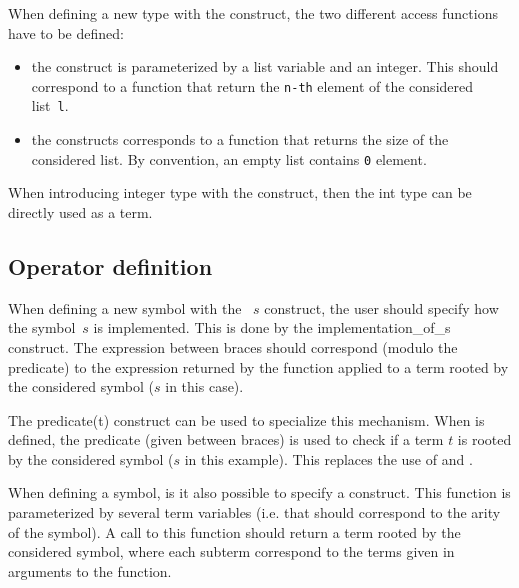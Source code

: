 \noindent\label{arraydef}
When defining a new type with the  construct,
the two different access functions have to be defined:
\begin{itemize}
\item\label{gete} the  construct is parameterized by a list
  variable and an integer. This should correspond to a function that
  return the \texttt{n-th} element of the considered list~\texttt{l}.

\item\label{getsize} the  constructs corresponds to a function
  that returns the size of the considered list.
  By convention, an empty list contains \texttt{0} element.
\end{itemize}

\noindent\label{int}
When introducing integer type with the  construct, then
the int type can be directly used as a term.

\subsection{Operator definition}\label{opdef}
\noindent
When defining a new symbol with the ~$s$ construct, the user
should specify how the symbol~$s$ is implemented. This is done by the
 \lex{\{} implementation\_of\_s \lex{\}} construct.\label{fsym}
The expression between braces should correspond (modulo the
 predicate) to the expression returned by the
function  applied to a term rooted by the
considered symbol ($s$ in this case).  

\label{isfsym} 
The  \lex{\{} predicate(t) \lex{\}} construct can be
used to specialize this mechanism. When  is defined, the
predicate (given between braces) is used to check if a term $t$ is
rooted by the considered symbol ($s$ in this example). This replaces
the use of  and .

\label{make}When defining a symbol, is it also possible to specify a
 construct. This function is parameterized by several 
term variables (i.e. that should correspond to the arity of the
symbol). A call to this  function should return a term
rooted by the considered symbol, where each subterm correspond to the
terms given in arguments to the function.


